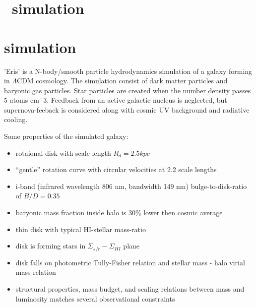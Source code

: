 \section{\eris\ simulation}


\iffalse
{}

\section{\eris simulation}

'Eris' is a N-body/smooth particle hydrodynamics simulation of a
galaxy forming in $\Lambda$CDM cosmology.
The simulation consist of dark matter particles and baryonic gas
particles. Star particles are created when the number density
passes 5 atoms cm$^-3$. Feedback from an active galactic nucleus
is neglected, but supernova-feeback is considered along with
cosmic UV background and radiative cooling.

Some properties of the simulated galaxy:
\begin{itemize}
\item{rotaional disk with scale length $R_d=2.5kpc$}
\item{``gentle'' rotation curve with circular velocities at 2.2
  scale lengths}
\item{i-band (infrared wavelength 806 nm, bandwidth 149 nm)
  bulge-to-disk-ratio of $B/D=0.35$}
\item{baryonic mass fraction inside halo is 30\% lower then
  cosmic average}
\item{thin disk with typical HI-stellar mass-ratio}
\item{disk is forming stars in $\Sigma_{sfr}-\Sigma_{HI}$ plane}
\item{disk falls on photometric Tully-Fisher relation and
  stellar mass - halo virial mass relation}
\item{structural properties, mass budget, and scaling relations between mass and luminosity matches several observational constraints}
\end{itemize}

